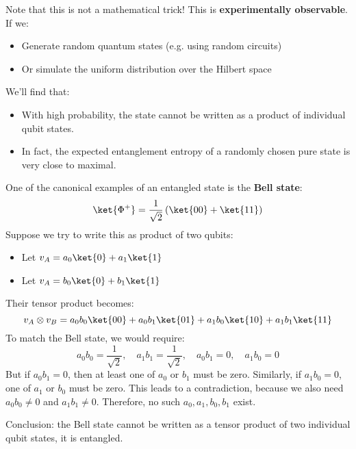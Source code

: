 \begin{itemize}
    \highspace
    Note that this is not a mathematical trick! This is \textbf{experimentally observable}. If we:
    \begin{itemize}
        \item Generate random quantum states (e.g. using random circuits)
        \item Or simulate the uniform distribution over the Hilbert space
    \end{itemize}
    We'll find that:
    \begin{itemize}
        \item With high probability, the state cannot be written as a product of individual qubit states.
        \item In fact, the expected entanglement entropy of a randomly chosen pure state is very close to maximal.
    \end{itemize}
\end{itemize}

\begin{examplebox}
    One of the canonical examples of an entangled state is the \textbf{Bell state}:
    \begin{equation}
        \ket{\Phi^{+}} = \dfrac{1}{\sqrt{2}}\left(\ket{00} + \ket{11}\right)
    \end{equation}
    Suppose we try to write this as product of two qubits:
    \begin{itemize}
        \item Let $v_{A} = a_{0} \ket{0} + a_{1}\ket{1}$
        \item Let $v_{A} = b_{0} \ket{0} + b_{1} \ket{1}$
    \end{itemize}
    Their tensor product becomes:
    \begin{equation*}
        v_{A} \otimes v_{B} = a_{0}b_{0}\ket{00} + a_{0}b_{1}\ket{01} + a_{1}b_{0}\ket{10} + a_{1}b_{1}\ket{11}
    \end{equation*}
    To match the Bell state, we would require:
    \begin{equation*}
        a_{0} b_{0} = \frac{1}{\sqrt{2}}, \quad a_{1} b_{1} = \frac{1}{\sqrt{2}}, \quad a_{0} b_{1} = 0, \quad a_{1} b_{0} = 0
    \end{equation*}
    But if $a_{0}b_{1} = 0$, then at least one of $a_{0}$ or $b_{1}$ must be zero. Similarly, if $a_{1}b_{0} = 0$, one of $a_{1}$ or $b_{0}$ must be zero. This leads to a contradiction, because we also need $a_{0}b_{0} \neq 0$ and $a_{1}b_{1} \neq 0$. Therefore, no such $a_{0}, a_{1}, b_{0}, b_{1}$ exist.

    Conclusion: the Bell state cannot be written as a tensor product of two individual qubit states, it is entangled.
\end{examplebox}

